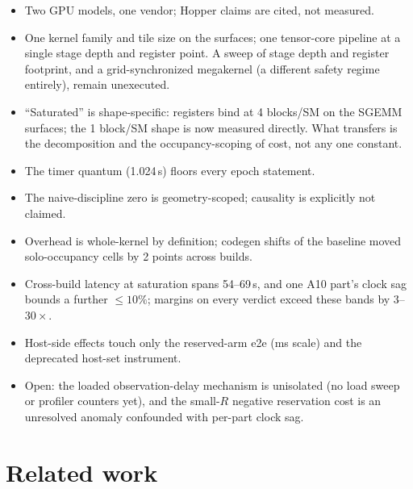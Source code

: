 \documentclass[11pt]{article}
\newcommand{\us}{\,\textmu s\xspace}
\begin{document}
\begin{itemize}
\item Two GPU models, one vendor; Hopper claims are cited, not
  measured.
\item One kernel family and tile size on the surfaces; one
  tensor-core pipeline at a single stage depth and register point. A
  sweep of stage depth and register footprint, and a
  grid-synchronized megakernel (a different safety regime entirely),
  remain unexecuted.
\item ``Saturated'' is shape-specific: registers bind at 4 blocks/SM
  on the SGEMM surfaces; the 1 block/SM shape is now measured
  directly. What transfers is the decomposition and the
  occupancy-scoping of cost, not any one constant.
\item The timer quantum (1.024\us) floors every epoch statement.
\item The naive-discipline zero is geometry-scoped; causality is
  explicitly not claimed.
\item Overhead is whole-kernel by definition; codegen shifts of the
  baseline moved solo-occupancy cells by 2 points across builds.
\item Cross-build latency at saturation spans 54--69\us, and one A10
  part's clock sag bounds a further ${\le}10\%$; margins on every
  verdict exceed these bands by $3$--$30\times$.
\item Host-side effects touch only the reserved-arm e2e (ms scale)
  and the deprecated host-set instrument.
\item Open: the loaded observation-delay mechanism is unisolated (no
  load sweep or profiler counters yet), and the small-$R$ negative
  reservation cost is an unresolved anomaly confounded with per-part
  clock sag.
\end{itemize}

\section{Related work}
\end{document}
